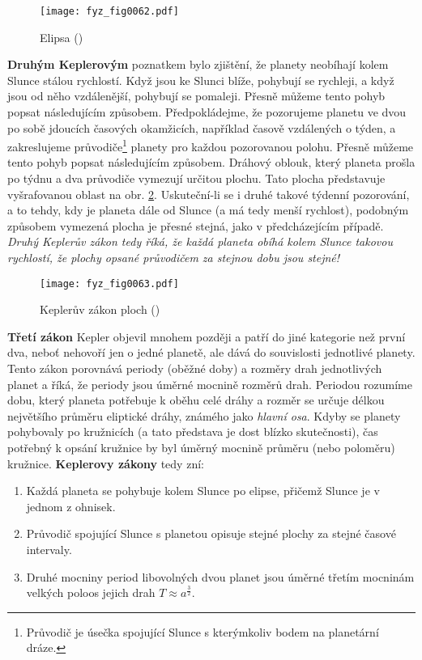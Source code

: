     \begin{figure}[ht!]  %
      \centering
      \texttt{[image: fyz\_fig0062.pdf]}
      \caption{Elipsa (\cite[s.~93]{Feynman01})}
      \label{fyz:fig0062}
    \end{figure}
    \textbf{Druhým Keplerovým} poznatkem bylo zjištění, že planety neobíhají kolem Slunce stálou 
    rychlostí. Když jsou ke Slunci blíže, pohybují se rychleji, a když jsou od něho vzdálenější, 
    pohybují se pomaleji. Přesně můžeme tento pohyb popsat následujícím způsobem. Předpokládejme, 
    že pozorujeme planetu ve dvou po sobě jdoucích časových okamžicích, například časově vzdálených 
    o týden, a zakreslujeme průvodiče\footnote{Průvodič je úsečka spojující Slunce s kterýmkoliv 
    bodem na planetární dráze.} planety pro každou pozorovanou polohu. Přesně můžeme tento pohyb 
    popsat následujícím způsobem. Dráhový oblouk, který planeta prošla po týdnu a dva průvodiče 
    vymezují určitou plochu. Tato plocha představuje vyšrafovanou oblast na obr. \ref{fyz:fig0063}. 
    Uskuteční-li se i druhé takové týdenní pozorování, a to tehdy, kdy je planeta dále od Slunce (a 
    má tedy menší rychlost), podobným způsobem vymezená plocha je přesné stejná, jako v 
    předcházejícím případě. \emph{Druhý Keplerův zákon tedy říká, že každá planeta obíhá kolem 
    Slunce takovou rychlostí, že plochy opsané průvodičem za stejnou dobu jsou stejné!}
    
    \begin{figure}[ht!]  %
      \centering
      \texttt{[image: fyz\_fig0063.pdf]}
      \caption{Keplerův zákon ploch (\cite[s.~94]{Feynman01})}
      \label{fyz:fig0063}
    \end{figure}
    \textbf{Třetí zákon} Kepler objevil mnohem později a patří do jiné kategorie než první dva, 
    neboť nehovoří jen o jedné planetě, ale dává do souvislosti jednotlivé planety. Tento zákon 
    porovnává periody (oběžné doby) a rozměry drah jednotlivých planet a říká, že periody jsou 
    úměrné  mocnině rozměrů drah. Periodou rozumíme dobu, který planeta potřebuje k oběhu 
    celé dráhy a rozměr se určuje délkou největšího průměru eliptické dráhy, známého jako 
    \emph{hlavní osa}. Kdyby se planety pohybovaly po kružnicích (a tato představa je dost blízko 
    skutečnosti), čas potřebný k opsání kružnice by byl úměrný  mocnině průměru (nebo 
    poloměru) kružnice. \textbf{Keplerovy zákony} tedy zní:
    
    \begin{enumerate}[noitemsep]
      \item Každá planeta se pohybuje kolem Slunce po elipse, přičemž Slunce je v jednom z ohnisek.
      \item Průvodič spojující Slunce s planetou opisuje stejné plochy za stejné časové intervaly.
      \item Druhé mocniny period libovolných dvou planet jsou úměrné třetím mocninám velkých poloos 
            jejich drah \(T\approx a^\frac{3}{2}\).
    \end{enumerate}
    
